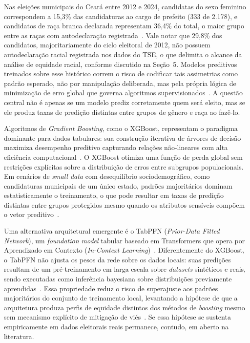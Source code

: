 \documentclass[12pt]{article}
\begin{document}
Nas eleições municipais do Ceará entre 2012 e 2024, candidatas do
sexo feminino correspondem a 15,3\% das candidaturas ao cargo de
prefeito (333 de 2.178), e candidatos de raça branca declarada
representam 36,4\% do total, o maior grupo entre as raças com
autodeclaração registrada~\cite{basedosdados:2026}. Vale notar que
29,8\% dos candidatos, majoritariamente do ciclo eleitoral de 2012,
não possuem autodeclaração racial registrada nos dados do TSE, o que
delimita o alcance da análise de equidade racial, conforme discutido
na Seção~5. Modelos preditivos treinados sobre esse histórico correm
o risco de codificar tais assimetrias como padrão esperado, não por
manipulação deliberada, mas pela própria lógica de minimização de
erro global que governa algoritmos supervisionados~\cite{grari:2020}.
A questão central não é apenas se um modelo prediz corretamente quem
será eleito, mas se ele produz taxas de predição distintas entre
grupos de gênero e raça ao fazê-lo.

Algoritmos de \textit{Gradient Boosting}, como o XGBoost,
representam o paradigma dominante para dados tabulares: sua
construção iterativa de árvores de decisão maximiza desempenho
preditivo capturando relações não-lineares com alta eficiência
computacional~\cite{ravichandran:2020}. O XGBoost otimiza uma função
de perda global sem restrições explícitas sobre a distribuição de
erros entre subgrupos populacionais. Em cenários de \textit{small
data} com desequilíbrio sociodemográfico, como candidaturas
municipais de um único estado, padrões majoritários dominam
estatisticamente o treinamento, o que pode resultar em taxas de
predição distintas entre grupos protegidos mesmo quando os atributos
sensíveis compõem o vetor preditivo~\cite{grari:2020,
ravichandran:2020}.

Uma alternativa arquitetural emergente é o TabPFN
(\textit{Prior-Data Fitted Network}), um \textit{foundation model}
tabular baseado em Transformers que opera por Aprendizado em Contexto
(\textit{In-Context Learning})~\cite{garg:2025, qu:2025}.
Diferentemente do XGBoost, o TabPFN não ajusta os pesos da rede
sobre os dados locais: suas predições resultam de um pré-treinamento
em larga escala sobre \textit{datasets} sintéticos e reais, sendo
executadas como inferência bayesiana sobre distribuições previamente
aprendidas~\cite{garg:2025, tabpfn:wiki:2025}. Essa propriedade
reduz o risco de superajuste aos padrões majoritários do conjunto de
treinamento local, levantando a hipótese de que a arquitetura produza
perfis de equidade distintos dos métodos de \textit{boosting} mesmo
sem mecanismo explícito de mitigação de viés~\cite{robertson:2024}.
Se essa hipótese se sustenta empiricamente em dados eleitorais reais
permanece, contudo, em aberto na literatura.
\end{document}
